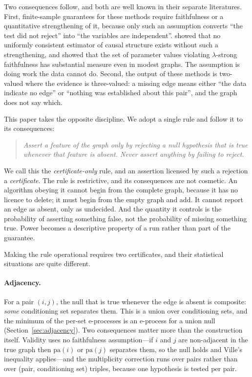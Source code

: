 \documentclass[pdflatex,sn-apa]{sn-jnl}
\theoremstyle{thmstyleone}%
\theoremstyle{thmstyletwo}%
\theoremstyle{thmstylethree}%
\newcommand{\pa}{\mathrm{pa}}
\begin{document}
Two consequences follow, and both are well known in their separate
literatures. First, finite-sample guarantees for these methods require
faithfulness or a quantitative strengthening of it, because only such an
assumption converts ``the test did not reject'' into ``the variables are
independent''. \citet{robins2003uniform} showed that no uniformly consistent
estimator of causal structure exists without such a strengthening, and
\citet{uhler2013geometry} showed that the set of parameter values violating
$\lambda$-strong faithfulness has substantial measure even in modest graphs.
The assumption is doing work the data cannot do. Second, the output of these
methods is two-valued where the evidence is three-valued: a missing edge means
either ``the data indicate no edge'' or ``nothing was established about this
pair'', and the graph does not say which.

This paper takes the opposite discipline. We adopt a single rule and follow it
to its consequences:

\begin{quote}
\emph{Assert a feature of the graph only by rejecting a null hypothesis that
is true whenever that feature is absent. Never assert anything by failing to
reject.}
\end{quote}

We call this the \emph{certificate-only} rule, and an assertion licensed by
such a rejection a \emph{certificate}. The rule is restrictive, and its
consequences are not cosmetic. An algorithm obeying it cannot begin from the
complete graph, because it has no licence to delete; it must begin from the
empty graph and add. It cannot report an edge as absent, only as undecided.
And the quantity it controls is the probability of asserting something false,
not the probability of missing something true. Power becomes a descriptive
property of a run rather than part of the guarantee.

Making the rule operational requires two certificates, and their statistical
situations are quite different.

\paragraph{Adjacency.} For a pair $(i,j)$, the null that is true whenever the
edge is absent is composite: \emph{some} conditioning set separates them. This
is a union over conditioning sets, and the minimum of the per-set e-processes
is an e-process for a union null (Section~\ref{sec:adjacency}). Two
consequences matter more than the construction itself. Validity uses no
faithfulness assumption---if $i$ and $j$ are non-adjacent in the true graph
then $\pa(i)$ or $\pa(j)$ separates them, so the null holds and Ville's
inequality applies---and the multiplicity correction runs over pairs rather
than over (pair, conditioning set) triples, because one hypothesis is tested
per pair.
\end{document}
